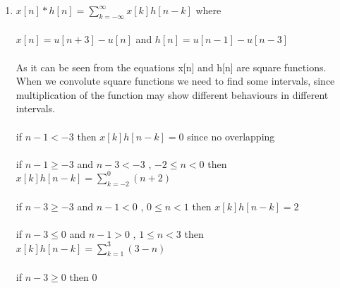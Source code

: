 \documentclass[10pt,a4paper, margin=1in]{article}
\begin{document}
\begin{enumerate}
\begin{enumerate}
        \begin{filecontents}{q4.dat}
 n   xn
 -3   6
 1  3
 0  2
 4  1
\end{filecontents}
    Plot of $x[n]*h[n]$
    \begin{figure} [H]
    \centering
\end{figure}


    \item %
    $x[n]*h[n] = \sum\limits_{k=-\infty}^{\infty} x[k]h[n-k]$ where \\ \\
    $x[n] = u[n+3] - u[n]$ and $h[n]=u[n-1]-u[n-3]$ \\ \\
    As it can be seen from the equations x[n] and h[n] are square functions. When we convolute square functions we need to find some intervals, since multiplication of the function may show different behaviours in different intervals. \\ \\
    if $n-1 < -3$ then $x[k]h[n-k]=0$ since no overlapping \\ \\
    if $n-1 \geq -3$ and $n-3 < -3$ , $-2 \leq n < 0$ then $x[k]h[n-k]=
    \sum\limits_{k=-2}^{0} (n+2)$ \\ \\
    if $n-3 \geq -3 $ and $n-1 < 0$ , $0 \leq n < 1$ then $x[k]h[n-k]=2$ \\ \\
    if $n-3 \leq 0$ and $n-1>0$ , $ 1 \leq n < 3$ then $x[k]h[n-k]=
    \sum\limits_{k=1}^{3} (3-n)$ \\ \\
    if $n-3 \geq 0$ then 0 \\ \\




\end{enumerate}
\end{enumerate}
\end{document}
